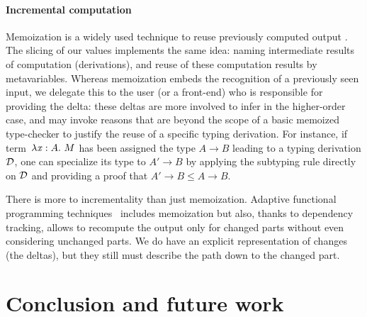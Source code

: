 \documentclass{llncs}
\begin{document}

\paragraph{Incremental computation}

Memoization is a widely used technique to reuse previously computed
output \cite{pugh1989incremental}. The slicing of our values
implements the same idea: naming intermediate results of computation
(derivations), and reuse of these computation results by
metavariables. Whereas memoization embeds the recognition of a
previously seen input, we delegate this to the user (or a front-end)
who is responsible for providing the delta: these deltas are more
involved to infer in the higher-order case, and may invoke reasons
that are beyond the scope of a basic memoized type-checker to justify
the reuse of a specific typing derivation. For instance, if
term~$\lambda{\ensuremath{\text{\textit{x}}}}:{A}.\  M$ has been assigned the type $A \rightarrow B$
leading to a typing derivation $\mathcal D$, one can specialize its type to
$A'\rightarrow B$ by applying the subtyping rule directly on $\mathcal D$ and
providing a proof that $A' \rightarrow B \leq A \rightarrow B$.

There is more to incrementality than just memoization. Adaptive
functional programming techniques~\cite{acar2006,carlsson2002}
includes memoization but also, thanks to dependency tracking, allows
to recompute the output only for changed parts without even
considering unchanged parts. We do have an explicit representation of
changes (the deltas), but they still must describe the path down to
the changed part.

\section*{Conclusion and future work}
\end{document}
